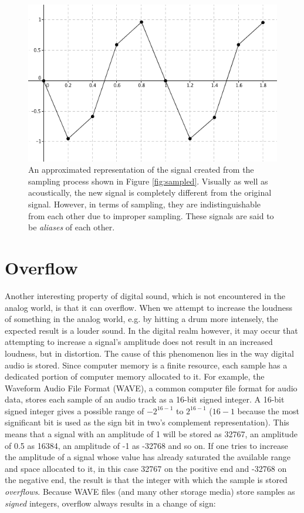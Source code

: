 \documentclass[12pt]{report}
\begin{document}
\begin{figure}

  \centering

  \includegraphics[scale=0.5]{img/approx}

  \caption{An approximated representation of the signal created from the sampling process shown in Figure \ref{fig:sampled}. Visually as well as acoustically, the new signal is completely different from the original signal. However, in terms of sampling, they are indistinguishable from each other due to improper sampling. These signals are said to be \emph{aliases} of each other.}

  \label{fig:approx}

\end{figure}

\section{Overflow}

Another interesting property of digital sound, which is not encountered in the analog world, is that it can overflow. When we attempt to increase the loudness of something in the analog world, e.g. by hitting a drum more intensely, the expected result is a louder sound. In the digital realm however, it may occur that attempting to increase a signal's amplitude does not result in an increased loudness, but in distortion. The cause of this phenomenon lies in the way digital audio is stored. Since computer memory is a finite resource, each sample has a dedicated portion of computer memory allocated to it. For example, the Waveform Audio File Format (WAVE), a common computer file format for audio data, stores each sample of an audio track as a 16-bit signed integer. A 16-bit signed integer gives a possible range of $-2^{16-1}$ to $2^{16-1}$ ($16-1$ because the most significant bit is used as the sign bit in two's complement representation). This means that a signal with an amplitude of 1 will be stored as 32767, an amplitude of 0.5 as 16384, an amplitude of -1 as -32768 and so on. If one tries to increase the amplitude of a signal whose value has already saturated the available range and space allocated to it, in this case 32767 on the positive end and -32768 on the negative end, the result is that the integer with which the sample is stored \emph{overflows}. Because WAVE files (and many other storage media) store samples as \emph{signed} integers, overflow always results in a change of sign:
\end{document}

